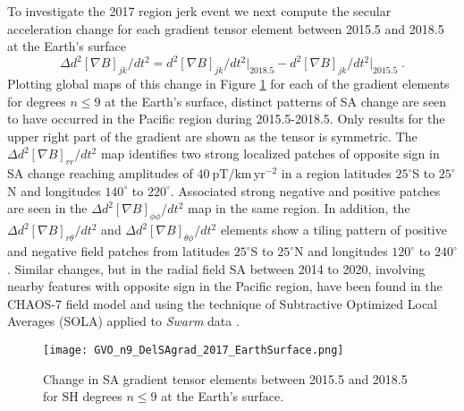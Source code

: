 \documentclass[extra,mreferee]{gji}
\begin{document}
To investigate the 2017 region jerk event we next compute the secular acceleration change for each gradient tensor element between 2015.5 and 2018.5 at the Earth's surface
\begin{equation}
\Delta d^2  \left[\nabla B\right]_{jk}  /dt^2 = d^2 \left[\nabla B\right]_{jk} /dt^2 \vert_{2018.5} - d^2  \left[\nabla B\right]_{jk} /dt^2 \vert_{2015.5} \; . \label{eq:12}
\end{equation}
Plotting global maps of this change in Figure \ref{Fig:13} for each of the gradient elements for degrees $n\leq9$ at the Earth's surface, distinct patterns of SA change are seen to have occurred in the Pacific region during 2015.5-2018.5. Only results for the upper right part of the gradient  are shown as the tensor is symmetric.  The $\Delta d^2 \left[\nabla B\right]_{rr} /dt^2$ map identifies two strong localized patches of opposite sign in SA change reaching amplitudes of $40 \: \mathrm{pT/km \, yr^{-2}}$ in a region  latitudes $25^{\circ}$S to $25^{\circ}$N and longitudes $140^{\circ}$ to $220^{\circ}$. Associated strong negative and positive patches are seen in the $\Delta d^2 \left[\nabla B\right]_{\phi \phi}  /dt^2$ map in the same region. In addition, the $\Delta d^2 \left[\nabla B\right]_{r \theta} /dt^2$ and $\Delta d^2 \left[\nabla B\right]_{\theta \phi} /dt^2$ elements show a tiling pattern of positive and negative field patches from latitudes $25^{\circ}$S to $25^{\circ}$N and longitudes $120^{\circ}$ to $240^{\circ}$. Similar changes, but in the radial field SA between 2014 to 2020, involving nearby features with opposite sign in the Pacific region, have been found in the CHAOS-7 field model \cite[]{Finlay_etal_2020} and using the technique of Subtractive Optimized Local Averages (SOLA) applied to \textit{Swarm} data \cite[]{Hammer_Finlay_2019, Hammer_etal_2021b}. 

\begin{figure}
\centerline{\texttt{[image: GVO\_n9\_DelSAgrad\_2017\_EarthSurface.png]}}
\caption{Change in SA gradient tensor elements between 2015.5 and 2018.5 for SH degrees $n\leq9$ at the Earth's surface.}
\label{Fig:13}
\end{figure} 
\end{document}
